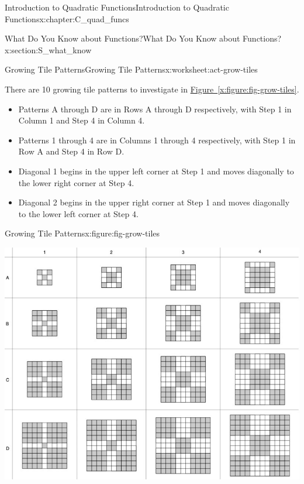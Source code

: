 \documentclass[oneside,10pt,]{book}
\newcommand{\xreffont}{\relax}
\numberwithin{equation}{chapter}
\begin{document}
\begin{chapterptx}{Introduction to Quadratic Functions}{}{Introduction to Quadratic Functions}{}{}{x:chapter:C_quad_funcs}
\begin{sectionptx}{What Do You Know about Functions?}{}{What Do You Know about Functions?}{}{}{x:section:S_what_know}
\typeout{************************************************}
%
\begin{worksheet-subsection}{Growing Tile Patterns}{}{Growing Tile Patterns}{}{}{x:worksheet:act-grow-tiles}
\begin{introduction}{}%
There are 10 growing tile patterns to investigate in \hyperref[x:figure:fig-grow-tiles]{Figure~{\xreffont\ref{x:figure:fig-grow-tiles}}}.%
\begin{itemize}[label=\textbullet]
\item{}Patterns A through D are in Rows A through D respectively, with Step 1 in Column 1 and Step 4 in Column 4.%
\item{}Patterns 1 through 4 are in Columns 1 through 4 respectively, with Step 1 in Row A and Step 4 in Row D.%
\item{}Diagonal 1 begins in the upper left corner at Step 1 and moves diagonally to the lower right corner at Step 4.%
\item{}Diagonal 2 begins in the upper right corner at Step 1 and moves diagonally to the lower left corner at Step 4.%
\end{itemize}
%
\end{introduction}%
\begin{figureptx}{Growing Tile Patterns}{x:figure:fig-grow-tiles}{}%
\begin{image}{0.05}{0.9}{0.05}%
\includegraphics[width=\linewidth]{external/grow-tiles.pdf}
\end{image}%

\end{figureptx}
\end{worksheet-subsection}
\end{sectionptx}
\end{chapterptx}
\end{document}
